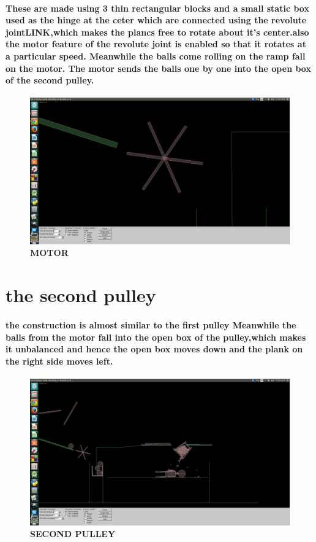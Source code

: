 \paragraph{
These are made using 3 thin rectangular blocks and a small static box used as the hinge at the ceter which are connected using the revolute joint\textbf{LINK},which makes the plancs free to rotate about it's center.also the motor feature of the revolute joint is enabled so that it rotates at a particular speed.
Meanwhile the  balls come rolling on the ramp fall on the motor.
The motor sends the balls one by one into the open box of the second pulley.
}
\begin{figure}[H]
  \centering
    \includegraphics[scale=0.2]{project/images/rotor.png}
  \caption{\textbf{MOTOR}}
\end{figure}

\section{the second pulley}
\paragraph{
the construction is almost similar to the first pulley
Meanwhile the balls from the motor fall  into the open box of the pulley,which makes it unbalanced and hence the open box moves down and the plank on the right side moves left.
}
\begin{figure}[H]
  \centering
    \includegraphics[scale=0.2]{project/images/bucket.png}
  \caption{\textbf{SECOND PULLEY}}
\end{figure}


